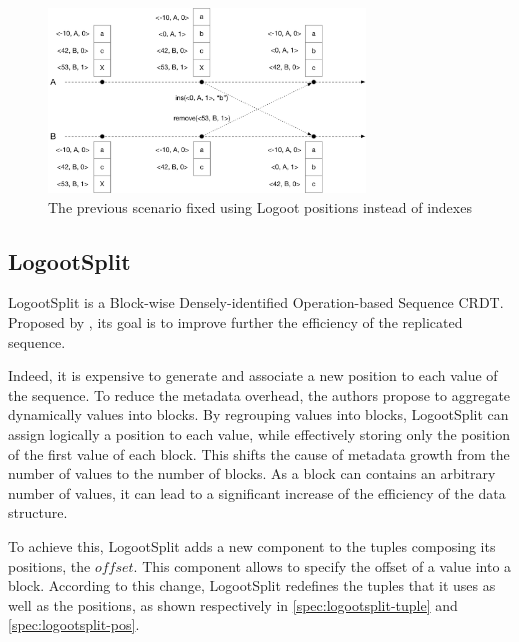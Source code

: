 \documentclass{article}
\theoremstyle{definition}
\begin{document}

\begin{figure}
    \centering
        \includegraphics[width=0.75\textwidth]{img/pos-based-seq.pdf}
    \caption{The previous scenario fixed using Logoot positions instead of indexes}
    \label{fig:logoot-seq-convergence}
\end{figure}


\subsection{LogootSplit}

LogootSplit \cite{AndreCollaborateCom2013} is a Block-wise Densely-identified Operation-based Sequence \ac{CRDT}.
Proposed by \textcite{AndreCollaborateCom2013}, its goal is to improve further the efficiency of the replicated sequence.

Indeed, it is expensive to generate and associate a new position to each value of the sequence.
To reduce the metadata overhead, the authors propose to aggregate dynamically values into blocks.
By regrouping values into blocks, LogootSplit can assign logically a position to each value, while effectively storing only the position of the first value of each block.
This shifts the cause of metadata growth from the number of values to the number of blocks.
As a block can contains an arbitrary number of values, it can lead to a significant increase of the efficiency of the data structure.

To achieve this, LogootSplit adds a new component to the tuples composing its positions, the $offset$.
This component allows to specify the offset of a value into a block.
According to this change, LogootSplit redefines the tuples that it uses as well as the positions, as shown respectively in \autoref{spec:logootsplit-tuple} and \autoref{spec:logootsplit-pos}.
\end{document}
